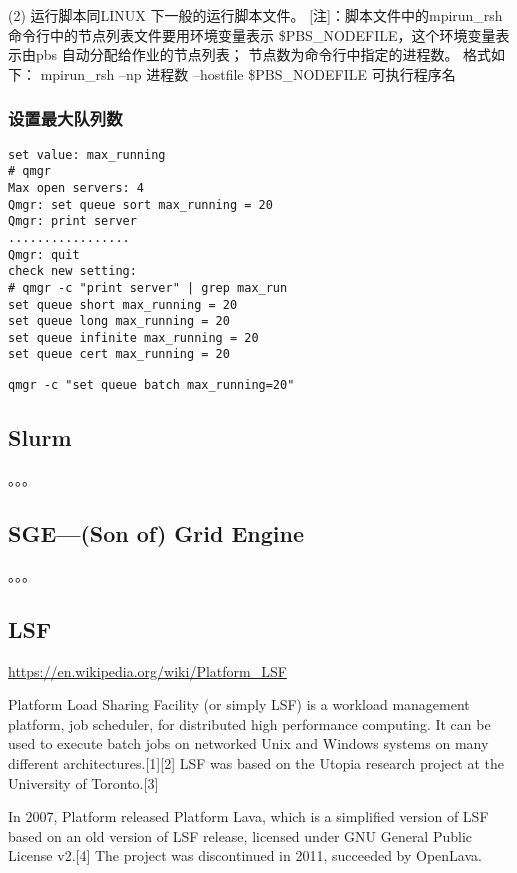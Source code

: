 {(2) 运行脚本同LINUX 下一般的运行脚本文件。
[注]：脚本文件中的mpirun\_rsh 命令行中的节点列表文件要用环境变量表示
\$PBS\_NODEFILE，这个环境变量表示由pbs 自动分配给作业的节点列表；
节点数为命令行中指定的进程数。
格式如下：
mpirun\_rsh –np 进程数 –hostfile \$PBS\_NODEFILE 可执行程序名



\subsubsection{设置最大队列数}
\begin{verbatim}
set value: max_running
# qmgr
Max open servers: 4
Qmgr: set queue sort max_running = 20
Qmgr: print server
.................
Qmgr: quit
check new setting:
# qmgr -c "print server" | grep max_run
set queue short max_running = 20
set queue long max_running = 20
set queue infinite max_running = 20
set queue cert max_running = 20
\end{verbatim}

\verb|qmgr -c "set queue batch max_running=20"|



\subsection{Slurm}
。。。

\subsection{SGE—(Son of) Grid Engine}
。。。





\subsection{LSF}
\url{https://en.wikipedia.org/wiki/Platform_LSF}

Platform Load Sharing Facility (or simply LSF) is a workload management platform, job scheduler, for distributed high performance computing. It can be used to execute batch jobs on networked Unix and Windows systems on many different architectures.[1][2] LSF was based on the Utopia research project at the University of Toronto.[3]

In 2007, Platform released Platform Lava, which is a simplified version of LSF based on an old version of LSF release, licensed under GNU General Public License v2.[4] The project was discontinued in 2011, succeeded by OpenLava.

}
